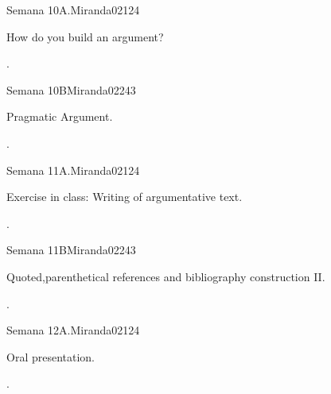 \begin{syllabus}
\begin{unit}{}{Semana 10A.}{Miranda02}{12}{4}
   \begin{topics}
      \item How do you build an argument?
   \end{topics}
   \begin{learningoutcomes}
      \item .
   \end{learningoutcomes}
\end{unit}

\begin{unit}{}{Semana 10B}{Miranda02}{24}{3}
   \begin{topics}
      \item Pragmatic Argument.
   \end{topics}

   \begin{learningoutcomes}
      \item . 
      \end{learningoutcomes}
\end{unit}

\begin{unit}{}{Semana 11A.}{Miranda02}{12}{4}
   \begin{topics}
      \item Exercise in class: Writing of argumentative text.
   \end{topics}
   \begin{learningoutcomes}
      \item .
   \end{learningoutcomes}
\end{unit}

\begin{unit}{}{Semana 11B}{Miranda02}{24}{3}
   \begin{topics}
      \item Quoted,parenthetical references and bibliography construction II.
   \end{topics}

   \begin{learningoutcomes}
      \item .
      \end{learningoutcomes}
\end{unit}

\begin{unit}{}{Semana 12A.}{Miranda02}{12}{4}
   \begin{topics}
      \item Oral presentation.
   \end{topics}
   \begin{learningoutcomes}
      \item .
   \end{learningoutcomes}
\end{unit}


\end{syllabus}
